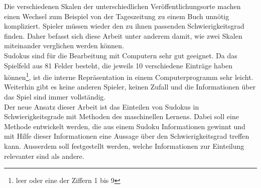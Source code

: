 Die verschiedenen Skalen der unterschiedlichen Veröffentlichungsorte machen einen Wechsel zum Beispiel von der Tageszeitung zu einem Buch unnötig kompliziert. Spieler müssen wieder den zu ihnen passenden Schwierigkeitsgrad finden. Daher befasst sich diese Arbeit unter anderem damit, wie zwei Skalen miteinander verglichen werden können.\\
Sudokus sind für die Bearbeitung mit Computern sehr gut geeignet. Da das Spielfeld aus 81 Felder besteht, die jeweils 10 verschiedene Einträge haben können\footnote{leer oder eine der Ziffern 1 bis 9}, ist die interne Repräsentation in einem Computerprogramm sehr leicht. Weiterhin gibt es keine anderen Spieler, keinen Zufall und die Informationen über das Spiel sind immer vollständig.\\
Der neue Ansatz dieser Arbeit ist das Einteilen von Sudokus in Schwierigkeitsgrade mit Methoden des maschinellen Lernens. Dabei soll eine Methode entwickelt werden, die aus einem Sudoku Informationen gewinnt und mit Hilfe dieser Informationen eine Aussage über den Schwierigkeitsgrad treffen kann. Ausserdem soll festgestellt werden, welche Informationen zur Einteilung relevanter sind als andere.